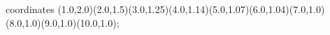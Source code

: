 					coordinates { (1.0,2.0)(2.0,1.5)(3.0,1.25)(4.0,1.14)(5.0,1.07)(6.0,1.04)(7.0,1.0)(8.0,1.0)(9.0,1.0)(10.0,1.0)};